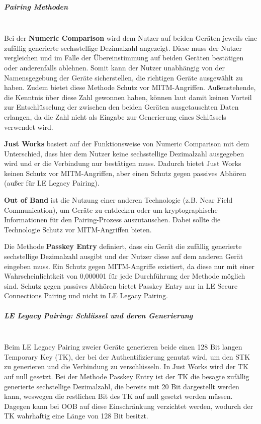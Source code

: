 \subparagraph{Pairing Methoden} \mbox{} \vspace{0.2cm} \\
Bei der \textbf{Numeric Comparison} wird dem Nutzer auf beiden Geräten jeweils eine zufällig generierte sechsstellige Dezimalzahl angezeigt. Diese muss der Nutzer vergleichen und im Falle der Übereinstimmung auf beiden Geräten bestätigen oder anderenfalls ablehnen. Somit kann der Nutzer unabhängig von der Namensgegebung der Geräte sicherstellen, die richtigen Geräte ausgewählt zu haben. Zudem bietet diese Methode Schutz vor MITM-Angriffen. Außenstehende, die Kenntnis über diese Zahl gewonnen haben, können laut \cite{BtSpec4.2_244-245} damit keinen Vorteil zur Entschlüsselung der zwischen den beiden Geräten ausgetauschten Daten erlangen, da die Zahl nicht als Eingabe zur Generierung eines Schlüssels verwendet wird.

\textbf{Just Works} basiert auf der Funktionsweise von Numeric Comparison mit dem Unterschied, dass hier dem Nutzer keine sechsstellige Dezimalzahl ausgegeben wird und er die Verbindung nur bestätigen muss. Dadurch bietet Just Works keinen Schutz vor MITM-Angriffen, aber einen Schutz gegen passives Abhören (außer für LE Legacy Pairing). \cite{BtSpec4.2_245}

\textbf{Out of Band} ist die Nutzung einer anderen Technologie (z.B. Near Field Communication), um Geräte zu entdecken oder um kryptographische Informationen für den Pairing-Prozess auszutauschen. Dabei sollte die Technologie Schutz vor MITM-Angriffen bieten. \cite{BtSpec4.2_246}

Die Methode \textbf{Passkey Entry} definiert, dass ein Gerät die zufällig generierte sechstellige Dezimalzahl ausgibt und der Nutzer diese auf dem anderen Gerät eingeben muss. Ein Schutz gegen MITM-Angriffe existiert, da diese nur mit einer Wahrscheinlichtkeit von 0,000001 für jede Durchführung der Methode möglich sind. Schutz gegen passives Abhören bietet Passkey Entry nur in LE Secure Connections Pairing und nicht in LE Legacy Pairing. \cite{BtSpec4.2_246-247} \cite{BtSpec4.2_2304}

\subparagraph{LE Legacy Pairing: Schlüssel und deren Generierung} \mbox{} \vspace{0.2cm} \\
Beim LE Legacy Pairing zweier Geräte generieren beide einen 128 Bit langen Temporary Key (TK), der bei der Authentifizierung genutzt wird, um den STK zu generieren und die Verbindung zu verschlüsseln. In Just Works wird der TK auf null gesetzt. Bei der Methode Passkey Entry ist der TK die besagte zufällig generierte sechstellige Dezimalzahl, die bereits mit 20 Bit dargestellt werden kann, weswegen die restlichen Bit des TK auf null gesetzt werden müssen. Dagegen kann bei OOB auf diese Einschränkung verzichtet werden, wodurch der TK wahrhaftig eine Länge von 128 Bit besitzt.

